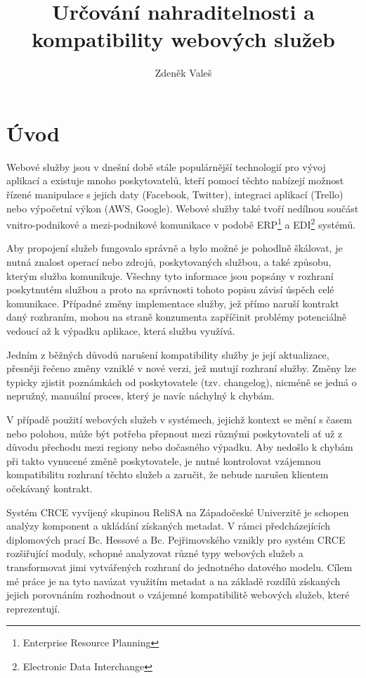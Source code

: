 \documentclass[czech,DP]{thesiskiv}
\author{Zdeněk Valeš}
\title{Určování nahraditelnosti a\\kompatibility webových služeb}
\begin{document}
%
\maketitle
\tableofcontents

\chapter{Úvod}


Webové služby jsou v dnešní době stále populárnější technologií pro vývoj aplikací a existuje mnoho poskytovatelů, kteří pomocí těchto nabízejí možnost řízené manipulace s jejich daty (Facebook, Twitter), integraci aplikací (Trello) nebo výpočetní výkon (AWS, Google). Webové služby také tvoří nedílnou součást vnitro-podnikové a mezi-podnikové komunikace v podobě ERP\footnote{Enterprise Resource Planning} a EDI\footnote{Electronic Data Interchange} systémů.
 
Aby propojení služeb fungovalo správně a bylo možné je pohodlně škálovat, je nutná znalost operací nebo zdrojů, poskytovaných službou, a také způsobu, kterým služba komunikuje. Všechny tyto informace jsou popsány v rozhraní poskytnutém službou a proto na správnosti tohoto popisu závisí úspěch celé komunikace. Případné změny implementace služby, jež přímo naruší kontrakt daný rozhraním, mohou na straně konzumenta zapříčinit problémy potenciálně vedoucí až k výpadku aplikace, která službu využívá. 

Jedním z běžných důvodů narušení kompatibility služby je její aktualizace, přesněji řečeno změny vzniklé v nové verzi, jež mutují rozhraní služby. Změny lze typicky zjistit poznámkách od poskytovatele (tzv. changelog), nicméně se jedná o nepružný, manuální proces, který je navíc náchylný k chybám.

V případě použití webových služeb v systémech, jejichž kontext se mění s časem nebo polohou, může být potřeba přepnout mezi různými poskytovateli ať už z důvodu přechodu mezi regiony nebo dočasného výpadku. Aby nedošlo k chybám při takto vynucené změně poskytovatele, je nutné kontrolovat vzájemnou kompatibilitu rozhraní těchto služeb a zaručit, že nebude narušen klientem očekávaný kontrakt.

Systém CRCE vyvíjený skupinou ReliSA na Západočeské Univerzitě je schopen analýzy komponent a ukládání získaných metadat. V rámci předcházejících diplomových prací Bc. Hessové a Bc. Pejřimovského vznikly pro systém CRCE rozšiřující moduly, schopné analyzovat různé typy webových služeb a transformovat jimi vytvářených rozhraní do jednotného datového modelu. Cílem mé práce je na tyto navázat využitím metadat a na základě rozdílů získaných jejich porovnáním rozhodnout o vzájemné kompatibilitě webových služeb, které reprezentují.
\end{document}

